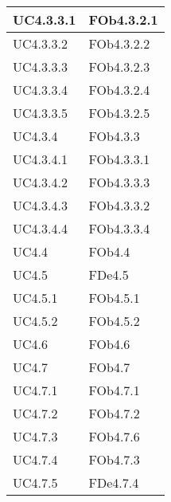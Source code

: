 \begin{longtable}{|l|p{4cm}|}
\hline
		UC4.3.3.1 & FOb4.3.2.1 \linebreak   \\
\hline
		UC4.3.3.2 & FOb4.3.2.2 \linebreak   \\
\hline
		UC4.3.3.3 & FOb4.3.2.3 \linebreak   \\
\hline
		UC4.3.3.4 & FOb4.3.2.4 \linebreak   \\
\hline
		UC4.3.3.5 & FOb4.3.2.5 \linebreak   \\
\hline
		UC4.3.4 & FOb4.3.3 \linebreak   \\
\hline
		UC4.3.4.1 & FOb4.3.3.1 \linebreak   \\
\hline
		UC4.3.4.2 & FOb4.3.3.3 \linebreak   \\
\hline
		UC4.3.4.3 & FOb4.3.3.2 \linebreak   \\
\hline
		UC4.3.4.4 & FOb4.3.3.4 \linebreak   \\
\hline
		UC4.4 & FOb4.4 \linebreak   \\
\hline
		UC4.5 & FDe4.5 \linebreak   \\
\hline
		UC4.5.1 & FOb4.5.1 \linebreak   \\
\hline
		UC4.5.2 & FOb4.5.2 \linebreak   \\
\hline
		UC4.6 & FOb4.6 \linebreak   \\
\hline
		UC4.7 & FOb4.7 \linebreak   \\
\hline
		UC4.7.1 & FOb4.7.1 \linebreak   \\
\hline
		UC4.7.2 & FOb4.7.2 \linebreak   \\
\hline
		UC4.7.3 & FOb4.7.6 \linebreak   \\
\hline
		UC4.7.4 & FOb4.7.3 \linebreak   \\
\hline
		UC4.7.5 & FDe4.7.4 \linebreak   \\

\end{longtable}
